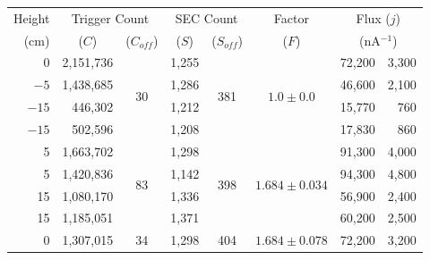 \begin{table}
  \begin{center}
    \begin{tabular}{ r | r | c | c | c | c | r@{~\(\pm\)~}r } 
      Height   &  \multicolumn{2}{c|}{Trigger Count}    &  \multicolumn{2}{c|}{SEC Count}  &  Factor   &  \multicolumn{2}{c}{Flux (\(j\))}          \\
      (cm)     &  \multicolumn{1}{c|}{(\(C\))}  
                             &  (\(C_{off}\))           &    (\(S\))   &   (\(S_{off}\))   &  (\(F\))  &  \multicolumn{2}{c}{(nA\(^{-1}\))} \\
      \hline
        0      &  2,151,736  &    \multirow{4}{*}{30}   &   1,255  &  \multirow{4}{*}{381} &  \multirow{4}{*}{\(1.0\pm0.0\)}  
                                                                                                      &  72,200 & 3,300  \\
      \(-5 \)  &  1,438,685  &                          &   1,286  &                       &          &  46,600 & 2,100  \\
      \(-15\)  &    446,302  &                          &   1,212  &                       &          &  15,770 &   760  \\
      \(-15\)  &    502,596  &                          &   1,208  &                       &          &  17,830 &   860  \\
      \hline            
        5      &  1,663,702  &   \multirow{4}{*}{83}    &   1,298  &  \multirow{4}{*}{398} &  \multirow{4}{*}{\(1.684\pm0.034\)}  
                                                                                                      &  91,300 & 4,000  \\
        5      &  1,420,836  &                          &   1,142  &                       &          &  94,300 & 4,800  \\
       15      &  1,080,170  &                          &   1,336  &                       &          &  56,900 & 2,400  \\
       15      &  1,185,051  &                          &   1,371  &                       &          &  60,200 & 2,500  \\    
       \hline
        0      &  1,307,015  &         34               &   1,298  &             404       & \(1.684\pm0.078\)
                                                                                                      &  72,200 & 3,200  \\
    \end{tabular}
  \end{center}

\end{table}
